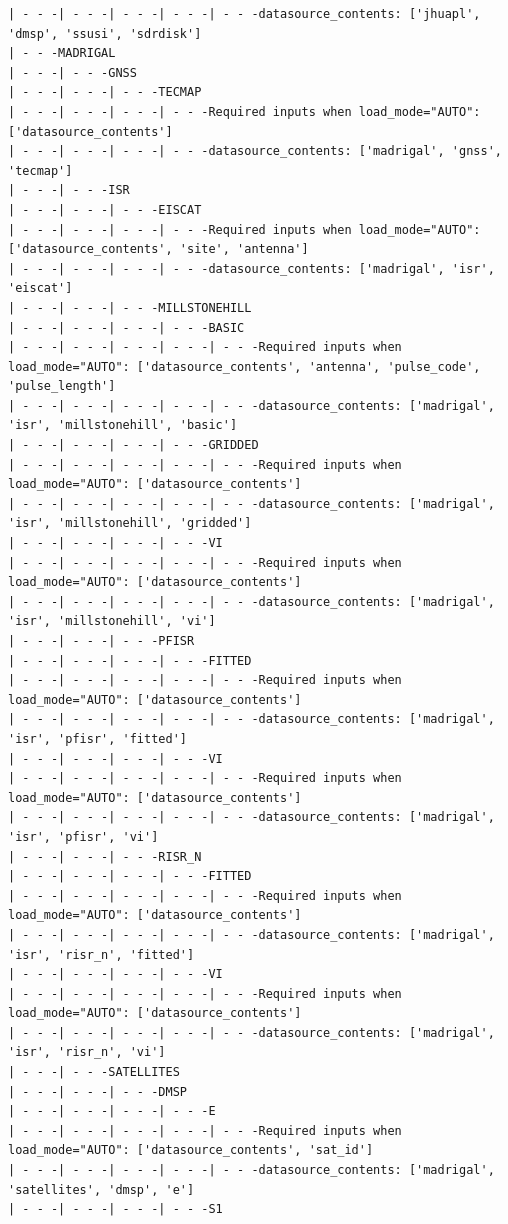 \begin{verbatim}
| - - -| - - -| - - -| - - -| - - -datasource_contents: ['jhuapl', 'dmsp', 'ssusi', 'sdrdisk']
| - - -MADRIGAL
| - - -| - - -GNSS
| - - -| - - -| - - -TECMAP
| - - -| - - -| - - -| - - -Required inputs when load_mode="AUTO": ['datasource_contents']
| - - -| - - -| - - -| - - -datasource_contents: ['madrigal', 'gnss', 'tecmap']
| - - -| - - -ISR
| - - -| - - -| - - -EISCAT
| - - -| - - -| - - -| - - -Required inputs when load_mode="AUTO": ['datasource_contents', 'site', 'antenna']
| - - -| - - -| - - -| - - -datasource_contents: ['madrigal', 'isr', 'eiscat']
| - - -| - - -| - - -MILLSTONEHILL
| - - -| - - -| - - -| - - -BASIC
| - - -| - - -| - - -| - - -| - - -Required inputs when load_mode="AUTO": ['datasource_contents', 'antenna', 'pulse_code', 'pulse_length']
| - - -| - - -| - - -| - - -| - - -datasource_contents: ['madrigal', 'isr', 'millstonehill', 'basic']
| - - -| - - -| - - -| - - -GRIDDED
| - - -| - - -| - - -| - - -| - - -Required inputs when load_mode="AUTO": ['datasource_contents']
| - - -| - - -| - - -| - - -| - - -datasource_contents: ['madrigal', 'isr', 'millstonehill', 'gridded']
| - - -| - - -| - - -| - - -VI
| - - -| - - -| - - -| - - -| - - -Required inputs when load_mode="AUTO": ['datasource_contents']
| - - -| - - -| - - -| - - -| - - -datasource_contents: ['madrigal', 'isr', 'millstonehill', 'vi']
| - - -| - - -| - - -PFISR
| - - -| - - -| - - -| - - -FITTED
| - - -| - - -| - - -| - - -| - - -Required inputs when load_mode="AUTO": ['datasource_contents']
| - - -| - - -| - - -| - - -| - - -datasource_contents: ['madrigal', 'isr', 'pfisr', 'fitted']
| - - -| - - -| - - -| - - -VI
| - - -| - - -| - - -| - - -| - - -Required inputs when load_mode="AUTO": ['datasource_contents']
| - - -| - - -| - - -| - - -| - - -datasource_contents: ['madrigal', 'isr', 'pfisr', 'vi']
| - - -| - - -| - - -RISR_N
| - - -| - - -| - - -| - - -FITTED
| - - -| - - -| - - -| - - -| - - -Required inputs when load_mode="AUTO": ['datasource_contents']
| - - -| - - -| - - -| - - -| - - -datasource_contents: ['madrigal', 'isr', 'risr_n', 'fitted']
| - - -| - - -| - - -| - - -VI
| - - -| - - -| - - -| - - -| - - -Required inputs when load_mode="AUTO": ['datasource_contents']
| - - -| - - -| - - -| - - -| - - -datasource_contents: ['madrigal', 'isr', 'risr_n', 'vi']
| - - -| - - -SATELLITES
| - - -| - - -| - - -DMSP
| - - -| - - -| - - -| - - -E
| - - -| - - -| - - -| - - -| - - -Required inputs when load_mode="AUTO": ['datasource_contents', 'sat_id']
| - - -| - - -| - - -| - - -| - - -datasource_contents: ['madrigal', 'satellites', 'dmsp', 'e']
| - - -| - - -| - - -| - - -S1

\end{verbatim}
